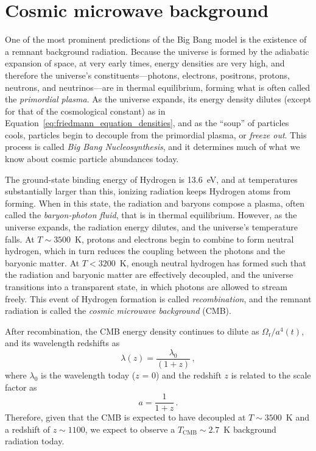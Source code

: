 \section{Cosmic microwave background}
\label{sec:cmb}

One of the most prominent predictions of the Big Bang model is the existence of a remnant background radiation. Because the universe is formed by the adiabatic expansion of space, at very early times, energy densities are very high, and therefore the universe's constituents---photons, electrons, positrons, protons, neutrons, and neutrinos---are in thermal equilibrium, forming what is often called the \textit{primordial plasma}. As the universe expands, its energy density dilutes (except for that of the cosmological constant) as in Equation~\ref{eq:friedmann_equation_densities}, and as the ``soup'' of particles cools, particles begin to decouple from the primordial plasma, or \textit{freeze out}. This process is called \textit{Big Bang Nucleosynthesis}, and it determines much of what we know about cosmic particle abundances today.

The ground-state binding energy of Hydrogen is 13.6~eV, and at temperatures substantially larger than this, ionizing radiation keeps Hydrogen atoms from forming. When in this state, the radiation and baryons compose a plasma, often called the \textit{baryon-photon fluid}, that is in thermal equilibrium. However, as the universe expands, the radiation energy dilutes, and the universe's temperature falls. At $T \sim 3500$~K, protons and electrons begin to combine to form neutral hydrogen, which in turn reduces the coupling between the photons and the baryonic matter. At $T < 3200$~K, enough neutral hydrogen has formed such that the radiation and baryonic matter are effectively decoupled, and the universe transitions into a transparent state, in which photons are allowed to stream freely. This event of Hydrogen formation is called \textit{recombination}, and the remnant radiation is called the \textit{cosmic microwave background} (CMB).

After recombination, the CMB energy density continues to dilute as $\Omega_{\mathrm{r}} / a^{4}(t)$, and its wavelength redshifts as
\begin{equation}
    \lambda(z) = \frac{\lambda_{0}}{(1 + z)} \, ,
    \label{eq:redshift}
\end{equation}
where $\lambda_{0}$ is the wavelength today ($z$ = 0) and the redshift $z$ is related to the scale factor as
\begin{equation}
    a = \frac{1}{1 + z}\, .
    \label{eq:redshift_to_scale_factor}
\end{equation}
Therefore, given that the CMB is expected to have decoupled at $T \sim 3500$~K and a redshift of $z \sim 1100$, we expect to observe a $T_{\mathrm{CMB}} \sim 2.7$~K background radiation today.

